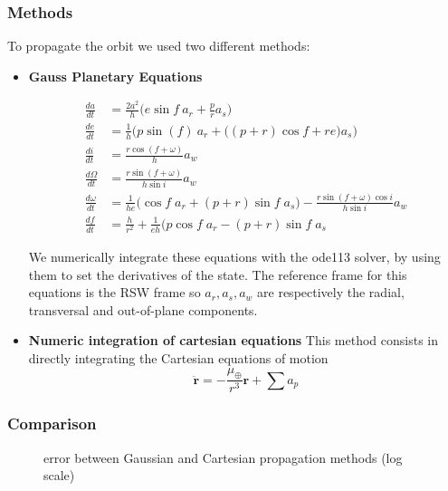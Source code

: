 \documentclass[11pt,a4paper]{report}
\renewcommand{\vec}[1]{\mathbf{#1}}
\begin{document}
\subsubsection{Methods}
To propagate the orbit we used two different methods:
\begin{itemize}
    \item \textbf{Gauss Planetary Equations}
    \par
    \begin{align*}
        \frac{da}{dt}&=\frac{2a^2}{h}\Big(e\sin f \: a_r +\frac{p}{r}a_s\Big)\\
        \frac{de}{dt}&=\frac{1}{h}\Big(p\sin(f) \: a_r+ \Big( (p+r)\cos f +re \Big) a_s\Big)\\
        \frac{di}{dt} &= \frac{r\cos(f+\omega)}{h}a_w\\
        \frac{d\Omega}{dt}&=\frac{r\sin (f+\omega) }{h \sin i}a_w\\
        \frac{d\omega}{dt}&=\frac{1}{he} \Big( \cos f \; a_r + (p+r)\sin f \; a_s \Big ) - \frac{r\sin(f+\omega)\cos i}{h\sin i} a_w\\
        \frac{df}{dt} &= \frac{h}{r^2} + \frac{1}{eh} \Big(p \cos f \; a_r - (p+r)\sin f \; a_s 
    \end{align*}

    \par
    We numerically integrate these equations with the ode113 solver, by using them to set the derivatives of the state.
    The reference frame for this equations is the RSW frame so $a_r, a_s, a_w$ are respectively the  radial, transversal and out-of-plane components. \cite{RSW_Curtis} \cite{RSW_Vallado} \cite{RSW_Battin}
    
    \item \textbf{Numeric integration of cartesian equations}
    This method consists in directly integrating the Cartesian equations of motion
    \begin{equation}
        \vec{\ddot{r}} = - \frac{\mu_{\oplus}}{r^3}\vec{r} + \sum{a_{p}}
    \end{equation}
    
\end{itemize}

\subsubsection{Comparison}
\par
\begin{figure}[H]
\centering
{}
    \caption{error between Gaussian and Cartesian propagation methods (log scale)}
\end{figure}
\end{document}
